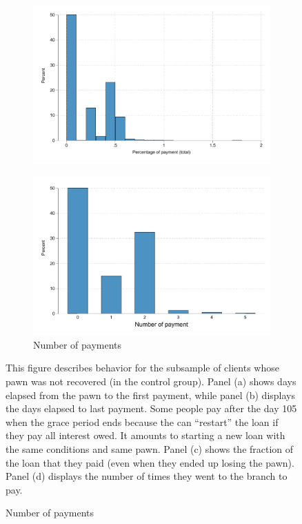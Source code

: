 \begin{figure}[H]
\begin{center}
\begin{subfigure}{0.40\textwidth}
        \centering
        \includegraphics[width=\textwidth]{Figuras/hist_percpay_default.pdf}
    \end{subfigure}
    \begin{subfigure}{0.40\textwidth}
        \caption{Number of payments}
        \centering
        \includegraphics[width=\textwidth]{Figuras/hist_numpay_default.pdf}
    \end{subfigure}
    \end{center}
        \scriptsize 
        This figure describes behavior for the subsample of clients whose pawn was not recovered (in the control group).  Panel (a) shows days elapsed from the pawn to the first payment, while panel (b) displays the days elapsed to last payment. Some people pay after the day 105 when the grace period ends because the can ``restart'' the loan if they pay all interest owed. It amounts to starting a new loan with the same conditions and same pawn. Panel (c) shows the fraction of the loan that they paid (even when they ended up losing the pawn). Panel (d) displays the number of times they went to the branch to pay.      
\end{figure}


